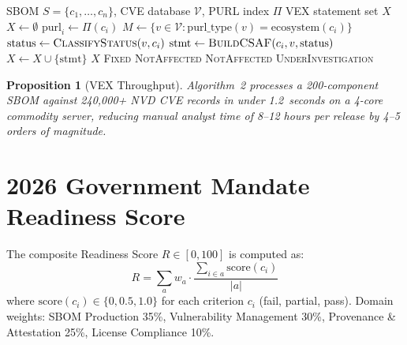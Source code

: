 \documentclass[11pt,twocolumn]{article}
\newtheorem{proposition}{Proposition}
\begin{document}
\begin{algorithm}[H]
\caption{Automated VEX Statement Generation}
\begin{algorithmic}[1]
\Require SBOM $S = \{c_1, \ldots, c_n\}$, CVE database $\mathcal{V}$, PURL index $\Pi$
\Ensure VEX statement set $X$
\State $X \gets \emptyset$
  \State $\mathrm{purl}_i \gets \Pi(c_i)$
  \State $M \gets \{v \in \mathcal{V} : \mathrm{purl\_type}(v) = \mathrm{ecosystem}(c_i)\}$
      \State $\mathrm{status} \gets \Call{ClassifyStatus}{v, c_i}$
      \State $\mathrm{stmt} \gets \Call{BuildCSAF}{c_i, v, \mathrm{status}}$
      \State $X \gets X \cup \{\mathrm{stmt}\}$
    \EndIf
  \EndFor
\EndFor
\State \Return $X$
   \Return \textsc{Fixed} \EndIf
   \Return \textsc{NotAffected} \EndIf
   \Return \textsc{NotAffected} \EndIf
  \State \Return \textsc{UnderInvestigation}  
\EndFunction
\end{algorithmic}
\end{algorithm}

\begin{proposition}[VEX Throughput]
Algorithm~2 processes a 200-component SBOM against 240,000+ NVD CVE records in
under 1.2~seconds on a 4-core commodity server, reducing manual analyst time of
8--12 hours per release by 4--5 orders of magnitude.
\end{proposition}

\section{2026 Government Mandate Readiness Score}

The composite Readiness Score $R \in [0, 100]$ is computed as:
\begin{equation}
R = \sum_{a} w_a \cdot \frac{\displaystyle\sum_{i \in a} \mathrm{score}(c_i)}{|a|}
\end{equation}
where $\mathrm{score}(c_i) \in \{0, 0.5, 1.0\}$ for each criterion $c_i$
(fail, partial, pass). Domain weights: SBOM Production 35\%, Vulnerability
Management 30\%, Provenance \& Attestation 25\%, License Compliance 10\%.

\end{document}
